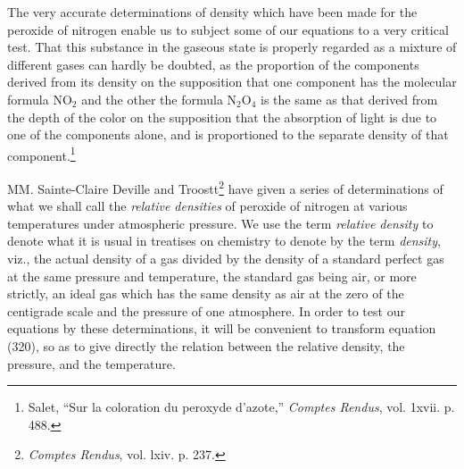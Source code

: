 \documentclass[12pt]{article}
\begin{document}
The very accurate determinations of density which have been made for the peroxide of nitrogen enable us to subject some of our equations to a very critical test. That this substance in the gaseous state is properly regarded as a mixture of different gases can hardly be doubted, as the proportion of the components derived from its density on the supposition that one component has the molecular formula NO$_2$ and the other the formula N$_2$O$_4$ is the same as that derived from the depth of the color on the supposition that the absorption of light is due to one of the components alone, and is proportioned to the separate density of that component.\footnote{Salet, ``Sur la coloration du peroxyde d'azote,'' \textit{Comptes Rendus}, vol. 1xvii. p. 488. }

MM. Sainte-Claire Deville and Troostt\footnote{\textit{Comptes Rendus}, vol. lxiv. p. 237.} have given a series of determinations of what we shall call the \textit{relative densities} of peroxide of nitrogen at various temperatures under atmospheric pressure. We use the term \textit{relative density} to denote what it is usual in treatises on chemistry to denote by the term \textit{density}, viz., the actual density of a gas divided by the density of a standard perfect gas at the same pressure and temperature, the standard gas being air, or more strictly, an ideal gas which has the same density as air at the zero of the centigrade scale and the pressure of one atmosphere. In order to test our equations by these determinations, it will be convenient to transform equation (320), so as to give directly the relation between the relative density, the pressure, and the temperature.
\end{document}
